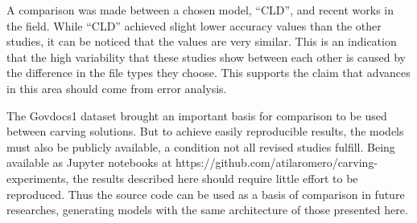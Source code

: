A comparison was made between a chosen model, ``CLD'', and recent works in the field. While ``CLD'' achieved slight lower accuracy values than the other studies, it can be noticed that the values are very similar. This is an indication that the high  variability that these studies show between each other is caused by the difference in the file types they choose. This supports the claim that advances in this area should come from error analysis.

The Govdocs1 dataset brought an important basis for comparison to be used between carving solutions. But to achieve easily reproducible results, the models must also be publicly available, a condition not all revised studies fulfill. Being available as Jupyter notebooks at https://github.com/atilaromero/carving-experiments, the results described here should require little effort to be reproduced. Thus the source code can be used as a basis of comparison in future researches, generating models with the same architecture of those presented here.

